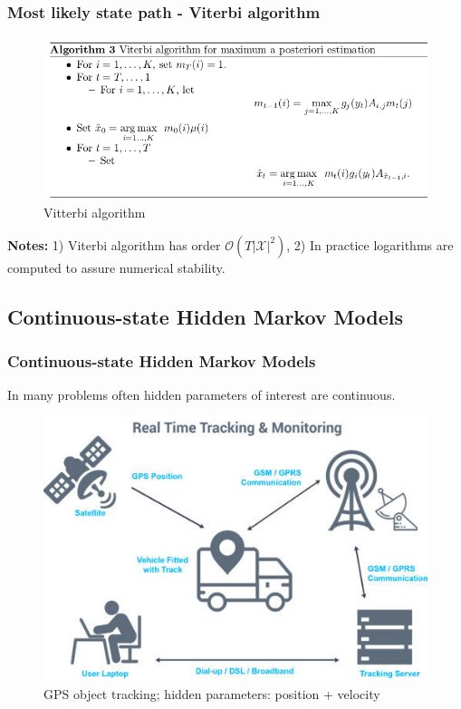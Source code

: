 \documentclass[xcolor=dvipsnames, compress]{beamer}
\begin{document}
\begin{frame}
\frametitle{Most likely state path - Viterbi algorithm}
\begin{figure}
	\includegraphics[scale=0.45]{images/viterbi2.jpg}
	\caption{Vitterbi algorithm}
\end{figure}

\textbf{Notes:} 1) Viterbi algorithm has order $\mathcal{O}(T |\mathcal{X}|^2)$, 2) In practice logarithms are computed to assure numerical stability.

\end{frame}



\begin{frame}
\section{Continuous-state Hidden Markov Models}
\frametitle{Continuous-state Hidden Markov Models}

In many problems often hidden parameters of interest are continuous. 

\begin{figure}
	\includegraphics[scale=0.45]{gps_cut.png}
	\caption{GPS object tracking; hidden parameters: position + velocity}
\end{figure}
\end{frame}
\end{document}
